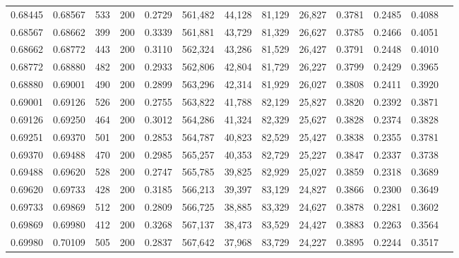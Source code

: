 \begin{tabular}{rrrrrrrrrrrrr}
0.68445 & 0.68567 &   533 & 200 &                                     0.2729 & 561,482 &  44,128 &  81,129 &  26,827 & 0.3781 & 0.2485 & 0.4088 \\
0.68567 & 0.68662 &   399 & 200 &                                     0.3339 & 561,881 &  43,729 &  81,329 &  26,627 & 0.3785 & 0.2466 & 0.4051 \\
0.68662 & 0.68772 &   443 & 200 &                                     0.3110 & 562,324 &  43,286 &  81,529 &  26,427 & 0.3791 & 0.2448 & 0.4010 \\
0.68772 & 0.68880 &   482 & 200 &                                     0.2933 & 562,806 &  42,804 &  81,729 &  26,227 & 0.3799 & 0.2429 & 0.3965 \\
0.68880 & 0.69001 &   490 & 200 &                                     0.2899 & 563,296 &  42,314 &  81,929 &  26,027 & 0.3808 & 0.2411 & 0.3920 \\
0.69001 & 0.69126 &   526 & 200 &                                     0.2755 & 563,822 &  41,788 &  82,129 &  25,827 & 0.3820 & 0.2392 & 0.3871 \\
0.69126 & 0.69250 &   464 & 200 &                                     0.3012 & 564,286 &  41,324 &  82,329 &  25,627 & 0.3828 & 0.2374 & 0.3828 \\
0.69251 & 0.69370 &   501 & 200 &                                     0.2853 & 564,787 &  40,823 &  82,529 &  25,427 & 0.3838 & 0.2355 & 0.3781 \\
0.69370 & 0.69488 &   470 & 200 &                                     0.2985 & 565,257 &  40,353 &  82,729 &  25,227 & 0.3847 & 0.2337 & 0.3738 \\
0.69488 & 0.69620 &   528 & 200 &                                     0.2747 & 565,785 &  39,825 &  82,929 &  25,027 & 0.3859 & 0.2318 & 0.3689 \\
0.69620 & 0.69733 &   428 & 200 &                                     0.3185 & 566,213 &  39,397 &  83,129 &  24,827 & 0.3866 & 0.2300 & 0.3649 \\
0.69733 & 0.69869 &   512 & 200 &                                     0.2809 & 566,725 &  38,885 &  83,329 &  24,627 & 0.3878 & 0.2281 & 0.3602 \\
0.69869 & 0.69980 &   412 & 200 &                                     0.3268 & 567,137 &  38,473 &  83,529 &  24,427 & 0.3883 & 0.2263 & 0.3564 \\
0.69980 & 0.70109 &   505 & 200 &                                     0.2837 & 567,642 &  37,968 &  83,729 &  24,227 & 0.3895 & 0.2244 & 0.3517 \\

\end{tabular}

